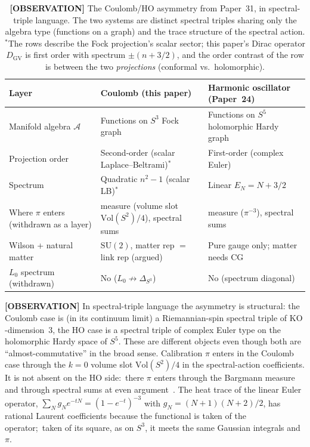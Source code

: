 \documentclass[11pt]{article}
\begin{document}
\begin{table}[h]
\centering
\small
\begin{tabular}{lll}
\toprule
Layer & Coulomb (this paper) & Harmonic oscillator (Paper~24) \\
\midrule
Manifold algebra $\mathcal{A}$ &
  Functions on $S^3$ Fock graph &
  Functions on $S^5$ holomorphic Hardy graph \\
Projection order &
  Second-order (scalar Laplace--Beltrami)$^{*}$ &
  First-order (complex Euler) \\
Spectrum &
  Quadratic $n^2 - 1$ (scalar LB)$^{*}$ &
  Linear $E_N = N + 3/2$ \\
Where $\pi$ enters (withdrawn as a layer) &
  measure (volume slot $\mathrm{Vol}(S^2)/4$), spectral sums &
  measure ($\pi^{-3}$), spectral sums \\
Wilson + natural matter &
  $\mathrm{SU}(2)$, matter rep $=$ link rep (argued) &
  Pure gauge only; matter needs CG \\
$L_0$ spectrum (withdrawn) &
  No ($L_0 \not\to \Delta_{S^3}$) &
  No (spectrum diagonal) \\ %
\bottomrule
\end{tabular}
\caption{\textbf{[OBSERVATION]} The Coulomb/HO asymmetry from Paper~31, in spectral-triple
language.  The two systems are distinct spectral triples sharing only
the algebra type (functions on a graph) and the trace structure of the
spectral action.  $^{*}$The rows describe the Fock projection's scalar
sector; this paper's Dirac operator $D_{\mathrm{GV}}$ is first order
with spectrum $\pm(n + 3/2)$, and the order contrast of the row is
between the two \emph{projections} (conformal vs.\ holomorphic).}
\label{tab:coulomb_ho}
\end{table}

\textbf{[OBSERVATION]} In spectral-triple language the asymmetry is structural: the Coulomb
case is (in its continuum limit) a Riemannian-spin spectral triple of $\mathrm{KO}$-dimension~3,
the HO case is a spectral triple of complex Euler type on the
holomorphic Hardy space of $S^5$.  These are different objects even
though both are ``almost-commutative'' in the broad sense.  Calibration
$\pi$ enters in the Coulomb case through the $k = 0$ volume slot
$\mathrm{Vol}(S^2) / 4$ in the spectral-action coefficients.  It is
not absent on the HO side:\ there $\pi$ enters through the Bargmann
measure and through spectral sums at even argument~\cite{paper24}.
The heat trace of the linear Euler operator,
$\sum_N g_N e^{-tN} = (1 - e^{-t})^{-3}$ with $g_N = (N+1)(N+2)/2$,
has rational Laurent coefficients because the functional is taken of
the operator;\ taken of its square, as on $S^3$, it meets the same
Gaussian integrals and $\pi$.
\end{document}
